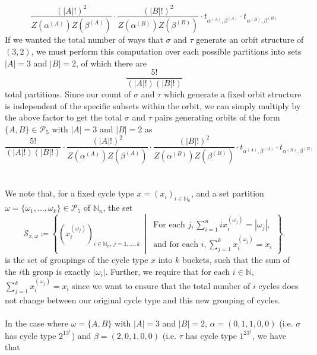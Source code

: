 \[
	\frac{(|A|!)^2}{Z(\alpha^{(A)})Z(\beta^{(A)})}\cdot\frac{(|B|!)^2}{Z(\alpha^{(B)})Z(\beta^{(B)})}\cdot t_{\alpha^{(A)},\beta^{(A)}}\cdot t_{\alpha^{(B)},\beta^{(B)}}
\]
If we wanted the total number of ways that $\sigma$ and $\tau$ generate an orbit structure of $(3,2)$, we must perform this computation over each possible partitions into sets $|A|=3$ and $|B|=2$, of which there are 
\[
\frac{5!}{(|A|!)(|B|!)}
\]
total partitions. Since our count of $\sigma$ and $\tau$ which generate a fixed orbit structure is independent of the specific subsets within the orbit, we can simply multiply by the above factor to get the total $\sigma$ and $\tau$ pairs generating orbits of the form $\{A,B\}\in\mathcal{P}_5$ with $|A| = 3$ and $|B| = 2$ as
\[
	\frac{5!}{(|A|!)(|B|!)}\cdot\frac{(|A|!)^2}{Z(\alpha^{(A)})Z(\beta^{(A)})}\cdot\frac{(|B|!)^2}{Z(\alpha^{(B)})Z(\beta^{(B)})}\cdot t_{\alpha^{(A)},\beta^{(A)}}\cdot t_{\alpha^{(B)},\beta^{(B)}}
\]
\\\\We note that, for a fixed cycle type \( x = (x_i)_{i \in \mathbb{N}_n} \), and a set partition \( \omega = \{\omega_1, \dots, \omega_k\} \in \mathcal{P}_5 \) of $\mathbb{N}_n$, the set
\[
\mathcal{S}_{x,\omega} \coloneqq \left\{ \left(x^{(\omega_j)}_i\right)_{i \in \mathbb{N}_n,\, j = 1,\dots,k} \,\middle|\, 
\begin{array}{l}
\text{For each } j, \sum_{i=1}^n i x^{(\omega_j)}_i = |\omega_j|, \\
\text{and for each } i, \sum_{j=1}^k x^{(\omega_j)}_i = x_i
\end{array}
\right\}.
\] is the set of groupings of the cycle type $x$ into $k$ buckets, such that the sum of the $i$th group is exactly $|\omega_i|$. Further, we require that for each $i\in\mathbb{N}$, $\sum_{j=1}^k x^{(\omega_j)}_i = x_i$ since we want to ensure that the total number of $i$ cycles does not change between our original cycle type and this new grouping of cycles.
\\\\In the case where $\omega = \{A,B\}$ with $|A| = 3$ and $|B| = 2$, $\alpha = (0,1,1,0,0)$ (i.e. $\sigma$ has cycle type $2^13^1$) and $\beta=(2,0,1,0,0)$ (i.e. $\tau$ has cycle type $1^23^1$, we have that 
